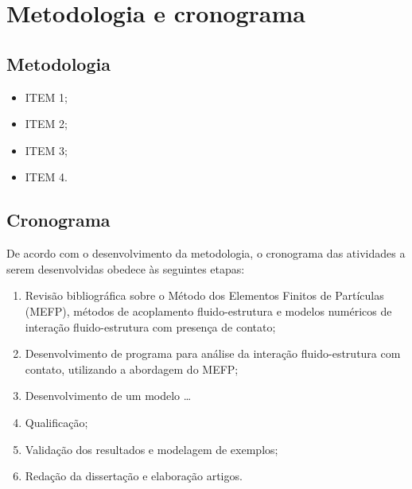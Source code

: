 \documentclass[_ArquivoPrincipal.tex]{subfiles}
\begin{document}
	
\chapter{Metodologia e cronograma}


\section{Metodologia}

\begin{itemize}
    \item ITEM 1;

    \item ITEM 2;

    \item ITEM 3;

    \item ITEM 4.

\end{itemize}


\section{Cronograma}

De acordo com o desenvolvimento da metodologia, o cronograma das atividades a serem desenvolvidas obedece às seguintes etapas:
\begin{enumerate}[label=\Roman*.]
	\item\label{Rev} Revisão bibliográfica sobre o Método dos Elementos Finitos de Partículas (MEFP), métodos de acoplamento fluido-estrutura e modelos numéricos de interação fluido-estrutura com presença de contato;
	\item\label{prog} Desenvolvimento de programa para análise da interação fluido-estrutura com contato, utilizando a abordagem do MEFP;
	\item\label{model} Desenvolvimento de um modelo \dots
	\item\label{Qual} Qualificação;
	\item\label{valid} Validação dos resultados e modelagem de exemplos;
	\item\label{red} Redação da dissertação e elaboração artigos.	
\end{enumerate}
\end{document}
